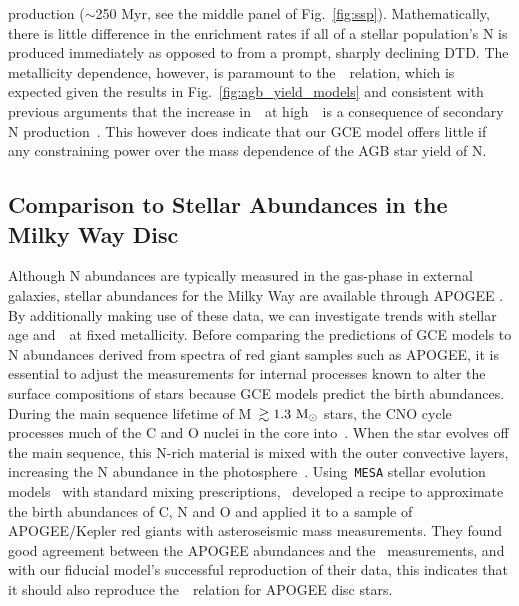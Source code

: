 \documentclass[ms.tex]{subfiles}
\begin{document}
production ($\sim$250 Myr, see the middle panel of Fig.~\ref{fig:ssp}).
Mathematically, there is little difference in the enrichment rates if all of a
stellar population's N is produced immediately as opposed to from a prompt,
sharply declining DTD.
The metallicity dependence, however, is paramount to the~\ohno~relation, which
is expected given the results in Fig.~\ref{fig:agb_yield_models} and consistent
with previous arguments that the increase in~\no~at high~\oh~is a consequence
of secondary N production~\citep{VilaCostas1993, vanZee1998, Henry1999,
PerezMontero2009, Berg2012, Pilyugin2012, Andrews2013, HaydenPawson2021}.
This however does indicate that our GCE model offers little if any
constraining power over the mass dependence of the AGB star yield of N.


\subsection{Comparison to Stellar Abundances in the Milky Way Disc}
\label{sec:results:vincenzo_comp}

Although N abundances are typically measured in the gas-phase in external
galaxies, stellar abundances for the Milky Way are available through APOGEE
\citep{Majewski2017}.
By additionally making use of these data, we can investigate trends with
stellar age and~\ofe~at fixed metallicity.
Before comparing the predictions of GCE models to N abundances derived from
spectra of red giant samples such as APOGEE, it is essential to adjust the
measurements for internal processes known to alter the surface compositions of
stars because GCE models predict the birth abundances.
During the main sequence lifetime of M~$\gtrsim 1.3~\text{M}_\odot$ stars, the CNO cycle
processes much of the C and O nuclei in the core into~\Nfourteen.
When the star evolves off the main sequence, this N-rich material is mixed with
the outer convective layers, increasing the N abundance in the
photosphere~\citep{Gilroy1989, Korn2007, Lind2008, Souto2018, Souto2019}.
Using~\texttt{MESA} stellar evolution models~\citep{Paxton2011, Paxton2013,
Paxton2015, Paxton2018} with standard mixing prescriptions,~\citet{Vincenzo2021}
developed a recipe to approximate the birth abundances of C, N and O and
applied it to a sample of APOGEE/Kepler red giants with asteroseismic mass
measurements.
They found good agreement between the APOGEE abundances and
the~\citet{Dopita2016} measurements, and with our fiducial model's successful
reproduction of their data, this indicates that it should also reproduce
the~\ohno~relation for APOGEE disc stars.
\end{document}
